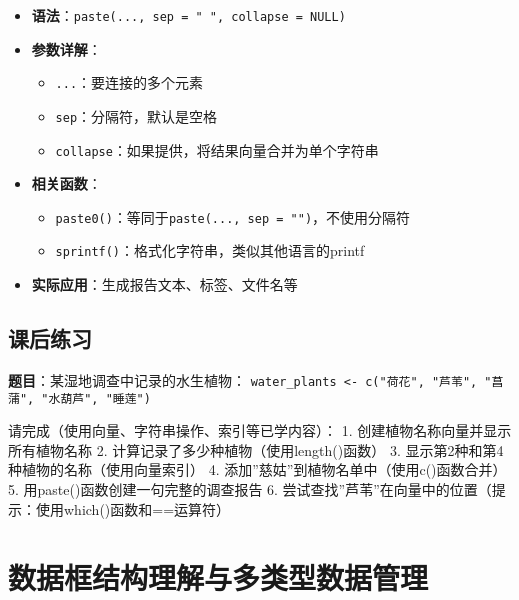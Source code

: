 \documentclass[
]{book}
\providecommand{\tightlist}{%
  \setlength{\itemsep}{0pt}\setlength{\parskip}{0pt}}
\begin{document}
\begin{itemize}
\tightlist
\item
  \textbf{语法}：\texttt{paste(...,\ sep\ =\ "\ ",\ collapse\ =\ NULL)}
\item
  \textbf{参数详解}：

  \begin{itemize}
  \tightlist
  \item
    \texttt{...}：要连接的多个元素
  \item
    \texttt{sep}：分隔符，默认是空格
  \item
    \texttt{collapse}：如果提供，将结果向量合并为单个字符串
  \end{itemize}
\item
  \textbf{相关函数}：

  \begin{itemize}
  \tightlist
  \item
    \texttt{paste0()}：等同于\texttt{paste(...,\ sep\ =\ "")}，不使用分隔符
  \item
    \texttt{sprintf()}：格式化字符串，类似其他语言的printf
  \end{itemize}
\item
  \textbf{实际应用}：生成报告文本、标签、文件名等
\end{itemize}

\hypertarget{ux8bfeux540eux7ec3ux4e60-1}{%
\subsection{课后练习}\label{ux8bfeux540eux7ec3ux4e60-1}}

\textbf{题目}：某湿地调查中记录的水生植物：
\texttt{water\_plants\ \textless{}-\ c("荷花",\ "芦苇",\ "菖蒲",\ "水葫芦",\ "睡莲")}

请完成（使用向量、字符串操作、索引等已学内容）：
1. 创建植物名称向量并显示所有植物名称
2. 计算记录了多少种植物（使用length()函数）
3. 显示第2种和第4种植物的名称（使用向量索引）
4. 添加''慈姑''到植物名单中（使用c()函数合并）
5. 用paste()函数创建一句完整的调查报告
6. 尝试查找''芦苇''在向量中的位置（提示：使用which()函数和==运算符）

\hypertarget{ux6570ux636eux6846ux7ed3ux6784ux7406ux89e3ux4e0eux591aux7c7bux578bux6570ux636eux7ba1ux7406}{%
\section{数据框结构理解与多类型数据管理}\label{ux6570ux636eux6846ux7ed3ux6784ux7406ux89e3ux4e0eux591aux7c7bux578bux6570ux636eux7ba1ux7406}}
\end{document}

